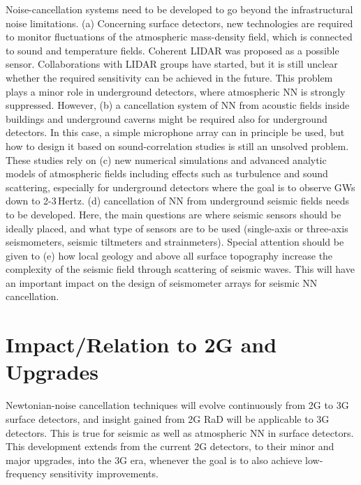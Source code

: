 Noise-cancellation systems need to be developed to go beyond the infrastructural noise limitations. (a) Concerning surface detectors, new technologies are required to monitor fluctuations of the atmospheric mass-density field, which is connected to sound and temperature fields. Coherent \ac{LIDAR} was proposed as a possible sensor. Collaborations with LIDAR groups have started, but it is still unclear whether the required sensitivity can be achieved in the future. This problem plays a minor role in underground detectors, where atmospheric \ac{NN} is strongly suppressed. However, (b) a cancellation system of \ac{NN} from acoustic fields inside buildings and underground caverns might be required also for underground detectors. In this case, a simple microphone array can in principle be used, but how to design it based on sound-correlation studies is still an unsolved problem. These studies rely on (c) new numerical simulations and advanced analytic models of atmospheric fields including effects such as turbulence and sound scattering, especially for underground detectors where the goal is to observe \acp{GW} down to 2-3\,Hertz. (d) cancellation of \ac{NN} from underground seismic fields needs to be developed. Here, the main questions are where seismic sensors should be ideally placed, and what type of sensors are to be used (single-axis or three-axis seismometers, seismic tiltmeters and strainmeters). Special attention should be given to (e) how local geology and above all surface topography increase the complexity of the seismic field through scattering of seismic waves. This will have an important impact on the design of seismometer arrays for seismic \ac{NN} cancellation.

\section{Impact/Relation to 2G and Upgrades}
Newtonian-noise cancellation techniques will evolve continuously from 2G to \ac{3G} surface detectors, and insight gained from 2G \ac{RaD} will be applicable to \ac{3G} detectors. This is true for seismic as well as atmospheric \ac{NN} in surface detectors. This development extends from the current 2G detectors, to their minor and major upgrades, into the \ac{3G} era, whenever the goal is to also achieve low-frequency sensitivity improvements. 

